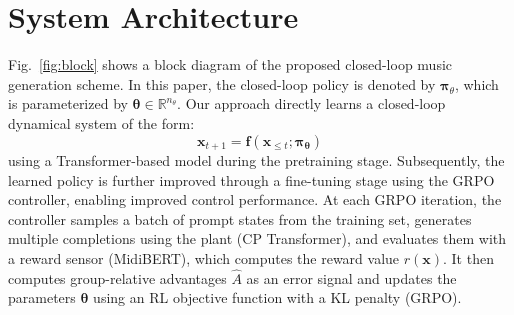 \documentclass[letterpaper, 10 pt, conference]{ieeeconf}
\begin{document}
\section{System Architecture}

Fig.~\ref{fig:block} shows a block diagram of the proposed closed-loop music generation scheme. 
In this paper, the closed-loop policy is denoted by $\bm{\pi}_{\theta}$, which is parameterized by $\bm{\theta} \in \mathbb{R}^{n_{\theta}}$. Our approach directly learns a closed-loop dynamical system of the form: 
\begin{equation}
    \label{eq:generalmodel}
    \textbf{x}_{t+1}=\textbf{f}(\textbf{x}_{\leq t}; \bm{\pi}_{\bm{\theta}})
\end{equation}    
  using a Transformer-based model during the pretraining stage. Subsequently, the learned policy is further improved through a fine-tuning stage using the GRPO controller, enabling improved control performance.
At each GRPO iteration, the controller samples a batch of prompt states from the training set, generates multiple completions using the plant (CP Transformer), and evaluates them with a reward sensor (MidiBERT), which computes the reward value $r(\textbf{x})$. It then computes group-relative advantages $\hat{A}$ as an error signal and updates the parameters $\bm{\theta}$ using an RL objective function with a KL penalty (GRPO). 

\end{document}
